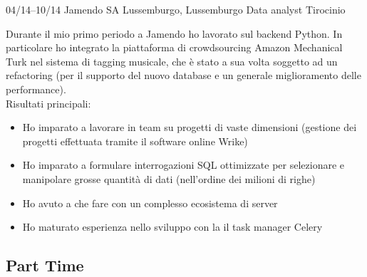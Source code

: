 \documentclass[print]{friggeri-custom} %
\begin{document}
\begin{entrylist}
\expentry
{04/14--10/14}
{Jamendo SA}
{Lussemburgo, Lussemburgo}
{Data analyst}
{Tirocinio}
{Durante il mio primo periodo a Jamendo ho lavorato sul backend Python. In particolare ho integrato la piattaforma di crowdsourcing Amazon Mechanical Turk nel sistema di tagging musicale, che è stato a sua volta soggetto ad un refactoring (per il supporto del nuovo database e un generale miglioramento delle performance). \\
Risultati principali:
\begin{itemize}
  \item Ho imparato a lavorare in team su progetti di vaste dimensioni (gestione dei progetti effettuata tramite il software online Wrike)
  \item Ho imparato a formulare interrogazioni SQL ottimizzate per selezionare e manipolare grosse quantità di dati (nell'ordine dei milioni di righe)
  \item Ho avuto a che fare con un complesso ecosistema di server
  \item Ho maturato esperienza nello sviluppo con la il task manager Celery
\end{itemize}}


\end{entrylist}

\subsection{Part Time}
\end{document}
